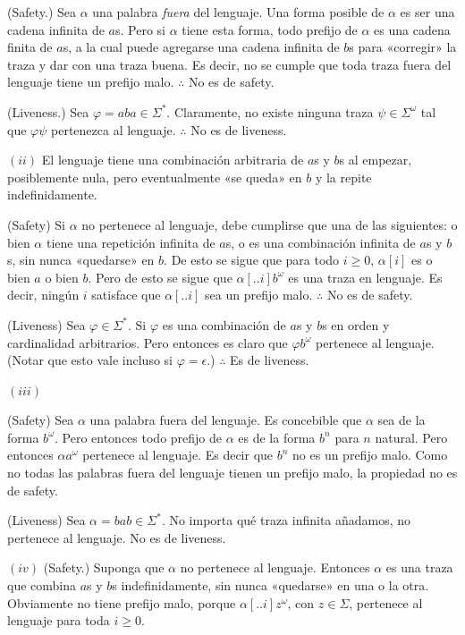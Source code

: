 \documentclass[a4paper, 12pt]{article}
\begin{document}
(Safety.) Sea $\alpha$ una palabra \textit{fuera} del lenguaje. Una
forma posible de $\alpha$ es ser una cadena infinita de $a$s. Pero si
$\alpha$ tiene esta forma, todo prefijo de $\alpha$ es una cadena finita de
$a$s, a la cual puede agregarse una cadena infinita de $b$s para «corregir» la
traza y dar con una traza buena. Es decir, no se cumple que toda traza fuera del
lenguaje tiene un prefijo malo. $\therefore $ No es de safety.

(Liveness.) Sea $\varphi = aba \in \Sigma^*$. Claramente, no existe ninguna
traza $\psi \in \Sigma^\omega$ tal que $\varphi\psi$ pertenezca al lenguaje. 
$\therefore $ No es de liveness.

$(ii)$ El lenguaje tiene una combinación arbitraria de $a$s y $b$s al empezar,
posiblemente nula, pero eventualmente «se queda» en $b$ y la repite
indefinidamente.

(Safety) Si $\alpha$ no pertenece al lenguaje, debe cumplirse que una de las siguientes:
o bien $\alpha$ tiene una repetición infinita de $a$s, o es una combinación
infinita de $a$s y $b$s, sin nunca «quedarse» en $b$. De esto se sigue que para
todo $i \geq 0$, $\alpha[i]$ es o bien $a$ o bien $b$. Pero de esto se sigue que 
$\alpha[..i]b^\omega$ es una traza en lenguaje. Es decir, ningún $i$ satisface
que $\alpha[..i]$ sea un prefijo malo. $\therefore $ No es de safety.

(Liveness) Sea $\varphi \in \Sigma^*$. Si $\varphi$ es una combinación de
$a$s y $b$s en orden y cardinalidad arbitrarios. Pero entonces es claro que
$\varphi b^\omega$ pertenece al lenguaje. (Notar que esto vale incluso si
$\varphi = \epsilon$.) $\therefore $ Es de liveness.

$(i i i )$ 

(Safety) Sea $\alpha$ una palabra fuera del lenguaje. Es concebible que $\alpha$
sea de la forma $b^\omega$. Pero entonces todo prefijo de $\alpha$ es de la
forma $b^n$ para $n$ natural. Pero entonces $\alpha a^\omega$ pertenece al
lenguaje. Es decir que $b^n$ no es un prefijo malo. Como no todas las palabras
fuera del lenguaje tienen un prefijo malo, la propiedad no es de safety.

(Liveness) Sea $\alpha = bab \in \Sigma^*$. No importa qué traza infinita
añadamos, no pertenece al lenguaje. No es de liveness.

$(i v)$ (Safety.) Suponga que $\alpha$ no pertenece al lenguaje. Entonces
$\alpha$ es una traza que combina $a$s y $b$s indefinidamente, sin nunca
«quedarse» en una o la otra. Obviamente no tiene prefijo malo, porque
$\alpha[..i]z^\omega$, con $z \in \Sigma$, pertenece al lenguaje para toda $i
\geq 0$.
\end{document}
